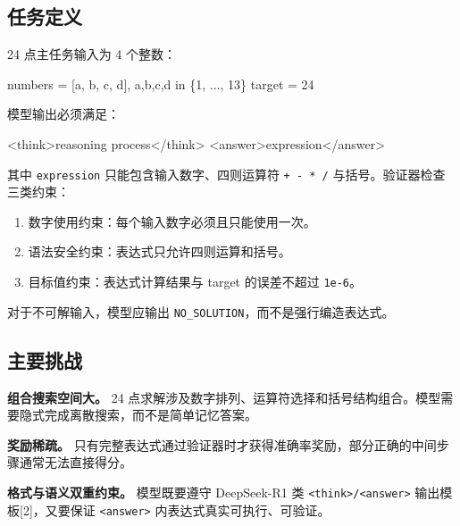 \documentclass[UTF8,a4paper,12pt]{ctexart}
\newenvironment{Shaded}{}{}
\newcommand{\NormalTok}[1]{#1}
\renewenvironment{Shaded}{\vspace{0.35em}\begin{tcolorbox}[enhanced,breakable,colback=zjucodebg,colframe=zjucodeframe,boxrule=0.45pt,leftrule=2.2pt,arc=1.6mm,left=1.8mm,right=1.8mm,top=1.2mm,bottom=1.2mm]}{\end{tcolorbox}\vspace{0.25em}}
\providecommand{\tightlist}{\setlength{\itemsep}{0pt}\setlength{\parskip}{0pt}}
\begin{document}
\subsection{任务定义}\label{ux4efbux52a1ux5b9aux4e49}

24 点主任务输入为 4 个整数：

\begin{Shaded}
\begin{Highlighting}[]
\NormalTok{numbers = [a, b, c, d],  a,b,c,d in \{1, ..., 13\}}
\NormalTok{target = 24}
\end{Highlighting}
\end{Shaded}

模型输出必须满足：

\begin{Shaded}
\begin{Highlighting}[]
\NormalTok{\textless{}think\textgreater{}reasoning process\textless{}/think\textgreater{}}
\NormalTok{\textless{}answer\textgreater{}expression\textless{}/answer\textgreater{}}
\end{Highlighting}
\end{Shaded}

其中 \texttt{expression} 只能包含输入数字、四则运算符 \texttt{+\ -\ *\ /} 与括号。验证器检查三类约束：

\begin{enumerate}
\def\labelenumi{\arabic{enumi}.}
\tightlist
\item
  数字使用约束：每个输入数字必须且只能使用一次。
\item
  语法安全约束：表达式只允许四则运算和括号。
\item
  目标值约束：表达式计算结果与 target 的误差不超过 \texttt{1e-6}。
\end{enumerate}

对于不可解输入，模型应输出 \texttt{NO\_SOLUTION}，而不是强行编造表达式。

\subsection{主要挑战}\label{ux4e3bux8981ux6311ux6218}

\textbf{组合搜索空间大。} 24 点求解涉及数字排列、运算符选择和括号结构组合。模型需要隐式完成离散搜索，而不是简单记忆答案。

\textbf{奖励稀疏。} 只有完整表达式通过验证器时才获得准确率奖励，部分正确的中间步骤通常无法直接得分。

\textbf{格式与语义双重约束。} 模型既要遵守 DeepSeek-R1 类 \texttt{\textless{}think\textgreater{}/\textless{}answer\textgreater{}} 输出模板{[}2{]}，又要保证 \texttt{\textless{}answer\textgreater{}} 内表达式真实可执行、可验证。
\end{document}
